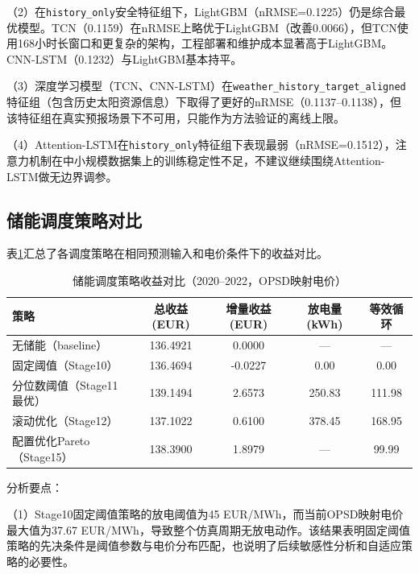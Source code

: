 \documentclass[12pt,a4paper]{ctexbook}
\begin{document}
（2）在\texttt{history\_only}安全特征组下，LightGBM（nRMSE=0.1225）仍是综合最优模型。TCN（0.1159）在nRMSE上略优于LightGBM（改善0.0066），但TCN使用168小时长窗口和更复杂的架构，工程部署和维护成本显著高于LightGBM。CNN-LSTM（0.1232）与LightGBM基本持平。\cite{lightgbm-2017,tcn-wan-2019,wang-cnn-lstm-2019}

（3）深度学习模型（TCN、CNN-LSTM）在\texttt{weather\_history\_target\_aligned}特征组（包含历史太阳资源信息）下取得了更好的nRMSE（0.1137--0.1138），但该特征组在真实预报场景下不可用，只能作为方法验证的离线上限。\cite{pv-deep-review-2025,tcn-wan-2019,wang-cnn-lstm-2019}

（4）Attention-LSTM在\texttt{history\_only}特征组下表现最弱（nRMSE=0.1512），注意力机制在中小规模数据集上的训练稳定性不足，不建议继续围绕Attention-LSTM做无边界调参。

\subsection{储能调度策略对比}

表\ref{tab:dispatch-comparison}汇总了各调度策略在相同预测输入和电价条件下的收益对比。

\begin{table}[H]
\centering
\caption{储能调度策略收益对比（2020--2022，OPSD映射电价）}
\label{tab:dispatch-comparison}
\begin{tabular}{@{}lcccc@{}}
\toprule
\textbf{策略} & \textbf{总收益(EUR)} & \textbf{增量收益(EUR)} & \textbf{放电量(kWh)} & \textbf{等效循环} \\
\midrule
无储能（baseline）        & 136.4921 & 0.0000  & —      & — \\
固定阈值（Stage10）       & 136.4694 & -0.0227 & 0.00   & 0.00 \\
分位数阈值（Stage11最优） & 139.1494 & 2.6573  & 250.83 & 111.98 \\
滚动优化（Stage12）       & 137.1022 & 0.6100  & 378.45 & 168.95 \\
配置优化Pareto（Stage15） & 138.3900 & 1.8979  & —      & 99.99 \\
\bottomrule
\end{tabular}
\end{table}

分析要点：

（1）Stage10固定阈值策略的放电阈值为45 EUR/MWh，而当前OPSD映射电价最大值为37.67 EUR/MWh，导致整个仿真周期无放电动作。该结果表明固定阈值策略的先决条件是阈值参数与电价分布匹配，也说明了后续敏感性分析和自适应策略的必要性。
\end{document}
